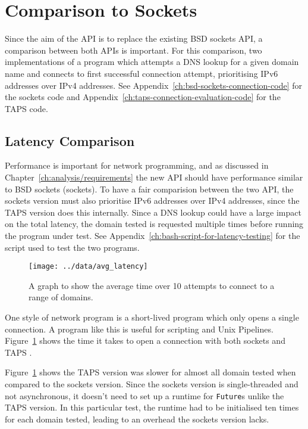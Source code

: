 \section{Comparison to Sockets}\label{sec:comparison-to-sockets}
Since the aim of the API is to replace the existing BSD sockets API, a comparison between both APIs is important.
For this comparison, two implementations of a program which attempts a DNS lookup for a given domain name and connects
to first successful connection attempt, prioritising IPv6 addresses over IPv4 addresses.
See Appendix~\ref{ch:bsd-sockets-connection-code} for the sockets code and Appendix~\ref{ch:taps-connection-evaluation-code}
for the TAPS code.

\subsection{Latency Comparison}\label{subsec:latency-comparison}
Performance is important for network programming, and as discussed in Chapter~\ref{ch:analysis/requirements} the new
API should have performance similar to BSD sockets (sockets).
To have a fair comparision between the two API, the sockets version must also prioritise IPv6 addresses over IPv4
addresses, since the TAPS version does this internally.
Since a DNS lookup could have a large impact on the total latency, the domain tested is requested multiple times before
running the program under test.
See Appendix~\ref{ch:bash-script-for-latency-testing} for the script used to test the two programs.

\begin{figure}[h]
    \texttt{[image: ../data/avg\_latency]}
    \caption{A graph to show the average time over 10 attempts to connect to a range of domains.}
    \label{fig:latency}
\end{figure}

One style of network program is a short-lived program which only opens a single connection.
A program like this is useful for scripting and Unix Pipelines.
Figure~\ref{fig:latency} shows the time it takes to open a connection with both sockets and TAPS .

Figure~\ref{fig:latency} shows the TAPS version was slower for almost all domain tested when compared to the sockets
version.
Since the sockets version is single-threaded and not asynchronous, it doesn't need to set up a runtime for
\texttt{Future}s unlike the TAPS version.
In this particular test, the runtime had to be initialised ten times for each domain tested, leading to an overhead the
sockets version lacks.


